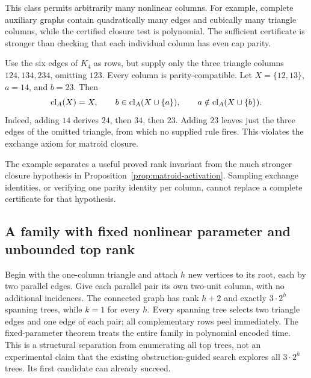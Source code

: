 This class permits arbitrarily many nonlinear columns. For example,
complete auxiliary graphs contain quadratically many edges and cubically
many triangle columns, while the certified closure test is polynomial.
The sufficient certificate is stronger than checking that each individual
column has even cap parity.

\begin{example}
\label{ex:nonmatroid}
Use the six edges of $K_4$ as rows, but supply only the three triangle
columns $124,134,234$, omitting $123$. Every column is parity-compatible.
Let $X=\{12,13\}$, $a=14$, and $b=23$. Then
\[
 \operatorname{cl}_A(X)=X,\qquad
 b\in\operatorname{cl}_A(X\cup\{a\}),\qquad
 a\notin\operatorname{cl}_A(X\cup\{b\}).
\]
Indeed, adding $14$ derives $24$, then $34$, then $23$. Adding $23$
leaves just the three edges of the omitted triangle, from which no supplied
rule fires. This violates the exchange axiom for matroid closure.
\end{example}

The example separates a useful proved rank invariant from the much stronger
closure hypothesis in Proposition~\ref{prop:matroid-activation}. Sampling
exchange identities, or verifying one parity identity per column, cannot
replace a complete certificate for that hypothesis.

\subsection{A family with fixed nonlinear parameter and unbounded top rank}

Begin with the one-column triangle and attach $h$ new vertices to its root,
each by two parallel edges. Give each parallel pair its own two-unit
column, with no additional incidences. The connected graph has rank $h+2$
and exactly $3\cdot2^h$ spanning trees, while $k=1$ for every $h$.
Every spanning tree selects two triangle edges and one edge of each pair;
all complementary rows peel immediately. The fixed-parameter theorem
treats the entire family in polynomial encoded time. This is a structural
separation from enumerating all top trees, not an experimental claim that
the existing obstruction-guided search explores all $3\cdot2^h$ trees.
Its first candidate can already succeed.
